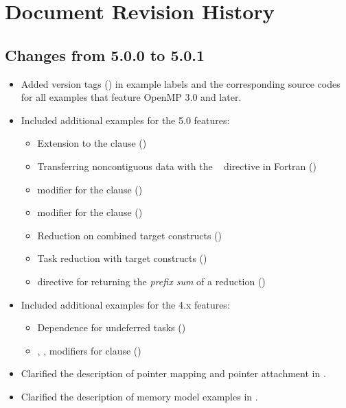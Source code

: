 \chapter{Document Revision History}
\label{chap:history}

\section{Changes from 5.0.0 to 5.0.1}
\label{sec:history_50_to_501}

\begin{itemize}
\item Added version tags () in example labels 
and the corresponding source codes for all examples that feature
OpenMP 3.0 and later. 

\item Included additional examples for the 5.0 features:

\begin{itemize}
\item Extension to the  clause
()
\item Transferring noncontiguous data with the ~ directive in Fortran ()
\item {} modifier for the  clause                             ()
\item {} modifier for the  clause                                      ()
\item Reduction on combined target constructs                                                     ()
\item Task reduction with target constructs 
   ()
\item {} directive for returning the \emph{prefix sum} of a reduction                  ()

\end{itemize}

\item Included additional examples for the 4.x features:

\begin{itemize}
\item Dependence for undeferred tasks
()
\item {}, ,  modifiers for  clause ()

\end{itemize}

\item Clarified the description of pointer mapping and pointer attachment in 
.
\item Clarified the description of memory model examples
in .

\end{itemize}


